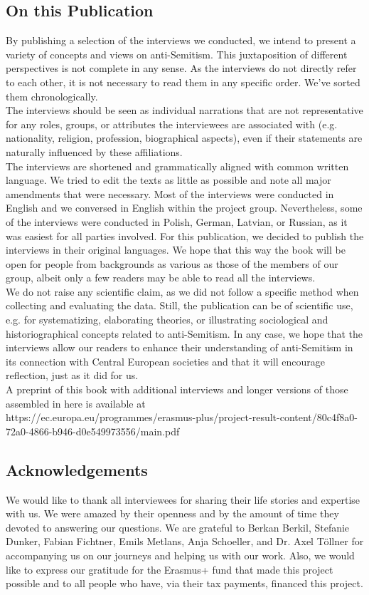 \subsection*{On this Publication}
By publishing a selection of the interviews we conducted, we intend to present a variety of concepts and views on anti-Semitism. This juxtaposition of different perspectives is not complete in any sense. As the interviews do not directly refer to each other, it is not necessary to read them in any specific order. We've sorted them chronologically. \\ 
The interviews should be seen as individual narrations that are not representative for any roles, groups, or attributes the interviewees are associated with (e.g. nationality, religion, profession, biographical aspects), even if their statements are naturally influenced by these affiliations. \\
The interviews are shortened and grammatically aligned with common written language. We tried to edit the texts as little as possible and note all major amendments that were necessary. Most of the interviews were conducted in English and we conversed in English within the project group. Nevertheless, some of the interviews were conducted in Polish, German, Latvian, or Russian, as it was easiest for all parties involved. For this publication, we decided to publish the interviews in their original languages.  We hope that this way the book will be open for people from backgrounds as various as those of the members of our group, albeit only a few readers may be able to read all the interviews.\\
We do not raise any scientific claim, as we did not follow a specific method when collecting and evaluating the data. Still, the publication can be of scientific use, e.g. for systematizing, elaborating theories, or illustrating sociological and historiographical concepts related to anti-Semitism. In any case, we hope that the interviews allow our readers to enhance their understanding of anti-Semitism in its connection with Central European societies and that it will encourage reflection, just as it did for us. \\
A preprint of this book with additional interviews and longer versions of those assembled in here is available at\\ https://ec.europa.eu/programmes/erasmus-plus/project-result-content/80c4f8a0-72a0-4866-b946-d0e549973556/main.pdf  
\subsection*{Acknowledgements}
We would like to thank all interviewees for sharing their life stories and expertise with us. We were amazed by their openness and by the amount of time they devoted to answering our questions. We are grateful to Berkan Berkil, Stefanie Dunker, Fabian Fichtner, Emils Metlans, Anja Schoeller, and Dr. Axel Töllner for accompanying us on our journeys and helping us with our work. Also, we would like to express our gratitude for the Erasmus+ fund that made this project possible and to all people who have, via their tax payments, financed this project. 
